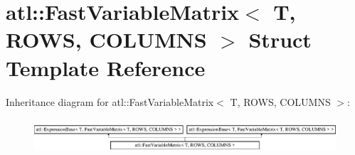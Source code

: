 \hypertarget{structatl_1_1_fast_variable_matrix}{\section{atl\+:\+:Fast\+Variable\+Matrix$<$ T, R\+O\+W\+S, C\+O\+L\+U\+M\+N\+S $>$ Struct Template Reference}
\label{structatl_1_1_fast_variable_matrix}
}
Inheritance diagram for atl\+:\+:Fast\+Variable\+Matrix$<$ T, R\+O\+W\+S, C\+O\+L\+U\+M\+N\+S $>$\+:\begin{figure}[H]
\begin{center}
\leavevmode
\includegraphics[height=1.320755cm]{structatl_1_1_fast_variable_matrix}
\end{center}
\end{figure}
